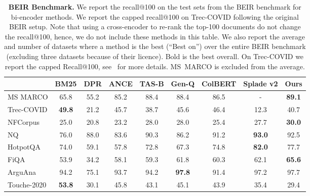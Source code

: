 \documentclass[10pt]{article} %
\begin{document}
\begin{table}[t!]
\caption{\textbf{BEIR Benchmark.} 
  We report the recall@100 on the test sets from the BEIR benchmark for bi-encoder methods. We report the capped recall@100 on Trec-COVID following the original BEIR setup.
  Note that using a cross-encoder to re-rank the top-100 documents do not change the recall@100, hence, we do not include these methods in this table.
  We also report the average and number of datasets where a method is the best (``Best on'') over the entire BEIR benchmark (excluding three datasets because of their licence).
  Bold is the best overall.
  On Trec-COVID we report the capped Recall@100, see~\citet{thakur2021beir} for more details.
  MS~MARCO is excluded from the average.
}
\label{tab:beir_recall}
\centering
\small
\begin{tabular}{@{}l  ccccccc >{\columncolor{bluegrey}}c} 
  \toprule
                & BM25          & DPR           & ANCE          & TAS-B        & Gen-Q     & ColBERT       & Splade v2     & Ours          \\
\midrule
MS MARCO        & 65.8          & 55.2          & 85.2          & 88.4          &  88.4         & 86.5          & -             & \textbf{89.1} \\
Trec-COVID      & \textbf{49.8} & 21.2          & 45.7          & 38.7          &  45.6         & 46.4          & 12.3          & 40.7          \\
NFCorpus        & 25.0          & 20.8          & 23.2          & 28.0          &  28.0         & 25.4          & 27.7          & \textbf{30.0} \\
NQ              & 76.0          & 88.0          & 83.6          & 90.3          &  86.2         & 91.2          & \textbf{93.0} & 92.5          \\
HotpotQA        & 74.0          & 59.1          & 57.8          & 72.8          &  67.3         & 74.8          & \textbf{82.0} & 77.7          \\
FiQA            & 53.9          & 34.2          & 58.1          & 59.3          &  61.8         & 60.3          & 62.1          & \textbf{65.6} \\
ArguAna         & 94.2          & 75.1          & 93.7          & 94.2          &  \bf 97.8         & 91.4          & 97.2          & 97.7 \\
Touche-2020     & \textbf{53.8} & 30.1          & 45.8          & 43.1          &  45.1         & 43.9          & 35.4          & 29.4          \\

\end{tabular}
\end{table}
\end{document}
